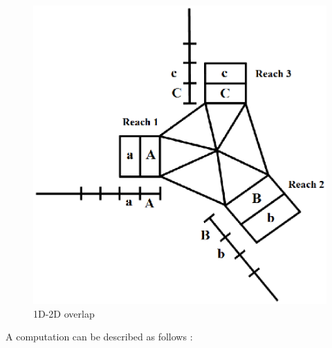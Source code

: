 \begin{figure}[h]
 \begin{center}
  \includegraphics[scale=0.8]{Figures/ConfPar2.eps}
  \caption{1D-2D overlap}
 \end{center}
\end{figure}

A computation can be described as follows :

\vspace{0.5cm}

